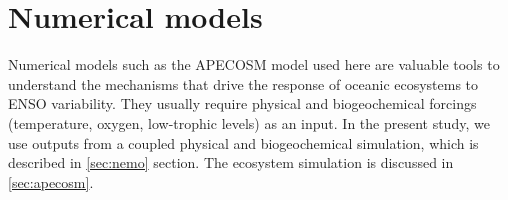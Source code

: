 \section{Numerical models}

Numerical models such as the APECOSM model used here are valuable tools to understand the mechanisms that drive the response of oceanic ecosystems to ENSO variability. They usually require physical and biogeochemical forcings (temperature, oxygen, low-trophic levels) as an input. In the present study, we use outputs from a coupled physical and biogeochemical simulation, which is described in \ref{sec:nemo} section. The ecosystem simulation is discussed in \ref{sec:apecosm}.





